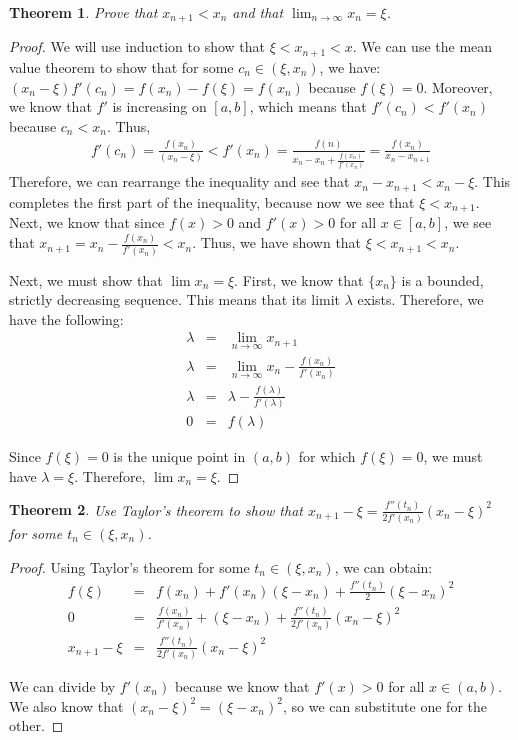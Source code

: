 \documentclass[psamsfonts]{amsart}
\newtheorem{thm}{Theorem}[section]
\theoremstyle{definition}
\theoremstyle{remark}
\numberwithin{equation}{section}
\begin{document}
\begin{thm}
Prove that $x_{n+1} < x_n$ and that $\lim_{n \to \infty} x_n = \xi$. 
\end{thm}

\begin{proof}
We will use induction to show that $ \xi < x_{n+1} < x$. We can use the mean value theorem to show that for some $c_n \in (\xi, x_n)$, we have: $(x_n - \xi) f'(c_n) = f(x_n) - f(\xi) = f(x_n)$ because $f(\xi) = 0$. Moreover, we know that $f'$ is increasing on $[a,b]$, which means that $f'(c_n) < f'(x_n)$ because $c_n < x_n$. Thus,
\begin{eqnarray}
f'(c_n) = \frac{f(x_n)}{(x_n - \xi)} < f'(x_n) = \frac{f(n)}{x_n - x_n + \frac{f(x_n)}{f'(x_n)}} = \frac{f(x_n)}{x_n - x_{n+1}}
\end{eqnarray}
Therefore, we can rearrange the inequality and see that $x_n - x_{n+1} < x_n - \xi$. This completes the first part of the inequality, because now we see that $\xi < x_{n+1}$. Next, we know that since $f(x) > 0$ and $f'(x) > 0$ for all $x \in [a,b]$, we see that $x_{n+1} = x_n - \frac{f(x_n)}{f'(x_n)} < x_n$. Thus, we have shown that $\xi < x_{n+1} < x_n$. 

Next, we must show that $\lim x_n = \xi$. First, we know that $\{ x_n \}$ is a bounded, strictly decreasing sequence. This means that its limit $\lambda$ exists. Therefore, we have the following:
\begin{eqnarray}
\lambda &=& \lim_{n \to \infty} x_{n+1} \\
\lambda &=& \lim_{n \to \infty} x_n - \frac{f(x_n)}{f'(x_n)} \\
\lambda &=& \lambda - \frac{f(\lambda)}{f'(\lambda)} \\
0 &=& f(\lambda)
\end{eqnarray}

Since $f(\xi) = 0$ is the unique point in $(a,b)$ for which $f(\xi) = 0$, we must have $\lambda = \xi$. Therefore, $\lim x_n = \xi$. 
\end{proof}

\begin{thm}
Use Taylor's theorem to show that $x_{n+1} - \xi = \frac{f''(t_n)}{2 f'(x_n)} (x_n - \xi)^2$ for some $t_n \in (\xi, x_n)$. 
\end{thm}

\begin{proof}
Using Taylor's theorem for some $t_n \in (\xi, x_n)$, we can obtain:
\begin{eqnarray}
f(\xi) &=& f(x_n) + f'(x_n) (\xi - x_n) + \frac{f''(t_n)}{2} (\xi - x_n)^2 \\
0 &=& \frac{f(x_n)}{f'(x_n)} + (\xi - x_n) + \frac{f''(t_n)}{2 f'(x_n)} (x_n - \xi)^2 \\
x_{n+1} - \xi &=&  \frac{f''(t_n)}{2 f'(x_n)} (x_n - \xi)^2 
\end{eqnarray}

We can divide by $f'(x_n)$ because we know that $f'(x) > 0$ for all $x \in (a,b)$. We also know that $(x_n - \xi)^2 = (\xi - x_n)^2$, so we can substitute one for the other.
\end{proof}
\end{document}
